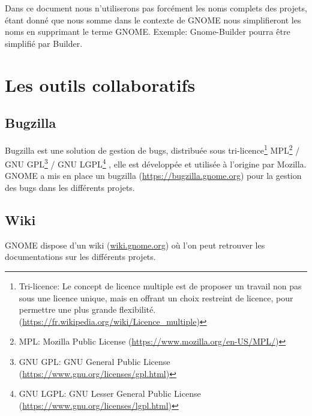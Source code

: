 \documentclass[12pt]{report}
\begin{document}
Dans ce document nous n'utiliserons pas forcément les noms complets des
projets, étant donné que nous somme dans le contexte de GNOME nous
simplifieront les noms en supprimant le terme GNOME.
Exemple: Gnome-Builder pourra être simplifié par Builder.

\section{Les outils collaboratifs} 
\subsection{Bugzilla}
\label{bugzilla}
Bugzilla est une solution de gestion de bugs, distribuée sous
tri-licence\footnote{Tri-licence: Le concept de licence multiple
  est de proposer un travail non pas sous une licence unique, mais
  en offrant un choix restreint de licence, pour permettre une plus
  grande flexibilité. 
  (\url{https://fr.wikipedia.org/wiki/Licence_multiple})}
MPL\footnote{MPL: Mozilla Public License 
  (\url{https://www.mozilla.org/en-US/MPL/})}
/ GNU GPL\footnote{GNU GPL: GNU General Public License 
  (\url{https://www.gnu.org/licenses/gpl.html})}
/ GNU LGPL\footnote{GNU LGPL: GNU Lesser General Public License 
  (\url{https://www.gnu.org/licenses/lgpl.html})}
, elle est développée et utilisée à l'origine par Mozilla.
GNOME a mis en place un bugzilla (\url{https://bugzilla.gnome.org}) pour 
la gestion des bugs dans les différents projets.


\subsection{Wiki}
\label{wiki}
GNOME dispose d'un wiki (\href{https://wiki.gnome.org/}{wiki.gnome.org})
où l'on peut retrouver les documentations sur les différents projets.
\end{document}
